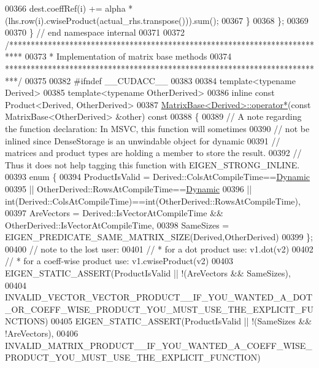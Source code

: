 \begin{DoxyCode}
00366       dest.coeffRef(i) += alpha * (lhs.row(i).cwiseProduct(actual\_rhs.transpose())).sum();
00367   \}
00368 \};
00369 
00370 \} \textcolor{comment}{// end namespace internal}
00371 
00372 \textcolor{comment}{/***************************************************************************}
00373 \textcolor{comment}{* Implementation of matrix base methods}
00374 \textcolor{comment}{***************************************************************************/}
00375 
00382 \textcolor{preprocessor}{#ifndef \_\_CUDACC\_\_}
00383 
00384 \textcolor{keyword}{template}<\textcolor{keyword}{typename} Derived>
00385 \textcolor{keyword}{template}<\textcolor{keyword}{typename} OtherDerived>
00386 \textcolor{keyword}{inline} \textcolor{keyword}{const} Product<Derived, OtherDerived>
00387 \hyperlink{group___core___module_ae2d220efbf7047f0894787888288cfcc}{MatrixBase<Derived>::operator*}(\textcolor{keyword}{const} MatrixBase<OtherDerived> &other)\textcolor{keyword}{ const}
00388 \textcolor{keyword}{}\{
00389   \textcolor{comment}{// A note regarding the function declaration: In MSVC, this function will sometimes}
00390   \textcolor{comment}{// not be inlined since DenseStorage is an unwindable object for dynamic}
00391   \textcolor{comment}{// matrices and product types are holding a member to store the result.}
00392   \textcolor{comment}{// Thus it does not help tagging this function with EIGEN\_STRONG\_INLINE.}
00393   \textcolor{keyword}{enum} \{
00394     ProductIsValid =  Derived::ColsAtCompileTime==\hyperlink{namespace_eigen_ad81fa7195215a0ce30017dfac309f0b2}{Dynamic}
00395                    || OtherDerived::RowsAtCompileTime==\hyperlink{namespace_eigen_ad81fa7195215a0ce30017dfac309f0b2}{Dynamic}
00396                    || int(Derived::ColsAtCompileTime)==int(OtherDerived::RowsAtCompileTime),
00397     AreVectors = Derived::IsVectorAtCompileTime && OtherDerived::IsVectorAtCompileTime,
00398     SameSizes = EIGEN\_PREDICATE\_SAME\_MATRIX\_SIZE(Derived,OtherDerived)
00399   \};
00400   \textcolor{comment}{// note to the lost user:}
00401   \textcolor{comment}{//    * for a dot product use: v1.dot(v2)}
00402   \textcolor{comment}{//    * for a coeff-wise product use: v1.cwiseProduct(v2)}
00403   EIGEN\_STATIC\_ASSERT(ProductIsValid || !(AreVectors && SameSizes),
00404     
      INVALID\_VECTOR\_VECTOR\_PRODUCT\_\_IF\_YOU\_WANTED\_A\_DOT\_OR\_COEFF\_WISE\_PRODUCT\_YOU\_MUST\_USE\_THE\_EXPLICIT\_FUNCTIONS)
00405   EIGEN\_STATIC\_ASSERT(ProductIsValid || !(SameSizes && !AreVectors),
00406     INVALID\_MATRIX\_PRODUCT\_\_IF\_YOU\_WANTED\_A\_COEFF\_WISE\_PRODUCT\_YOU\_MUST\_USE\_THE\_EXPLICIT\_FUNCTION)

\end{DoxyCode}
